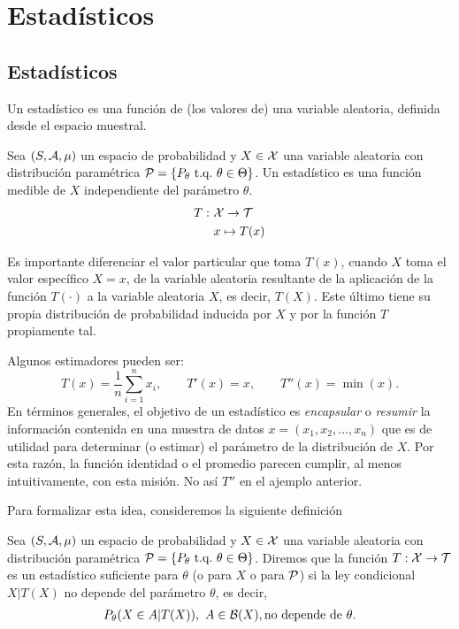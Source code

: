 

\chapter{Estadísticos}


\section{Estadísticos}

Un estadístico es una función de (los valores de) una variable aleatoria, definida desde el espacio muestral. 

\begin{definition}[Estadístico]
\label{def:estadístico}
Sea $(S,{\mathcal A},\mu)$ un espacio de probabilidad y $X\in{\mathcal X}$ una variable aleatoria con distribución paramétrica $\cP = \{P_\theta\ \tq\ \theta\in\Theta\}$. Un estadístico es una función medible de $X$ independiente del parámetro $\theta$.
\begin{align}
	T:\ &{\mathcal X} \rightarrow {\mathcal T}\\
	&x\mapsto T(x)
\end{align} 

\end{definition}


Es importante diferenciar el valor particular que toma $T(x)$, cuando $X$ toma el valor específico $X=x$, de la variable aleatoria resultante de la aplicación de la función $T(\cdot)$ a la variable aleatoria $X$, es decir, $T(X)$. Este último tiene su propia distribución de probabilidad inducida por $X$ y por la función $T$ propiamente tal. 

Algunos estimadores pueden ser: 
\begin{equation}
	T(x) = \frac{1}{n}\sum_{i=1}^nx_i,\qquad T'(x) = x, \qquad T''(x) = \min(x).
\end{equation}
En términos generales, el objetivo de un estadístico es \textit{encapsular} o \textit{resumir} la información contenida en una muestra de datos $x = (x_1,x_2,\ldots,x_n)$ que es de utilidad para determinar (o estimar) el parámetro de la distribución de $X$. Por esta razón, la función identidad o el promedio parecen cumplir, al menos intuitivamente, con esta misión. No así $T''$ en el ajemplo anterior. 

Para formalizar esta idea, consideremos la siguiente definición


\begin{definition}
\label{def:estadístico_suficiente}
Sea $(S,{\mathcal A},\mu)$ un espacio de probabilidad y $X\in{\mathcal X}$ una variable aleatoria con distribución paramétrica $\cP = \{P_\theta\ \tq\ \theta\in\Theta\}$. Diremos que la función $T:{\mathcal X}\rightarrow{\mathcal T}$ es un estadístico suficiente para $\theta$ (o para $X$ o para ${\mathcal P}$) si la ley condicional $X|T(X)$ no depende del parámetro $\theta$, es decir, 
\begin{align}
	P_\theta(X\in A | T(X)),\ A\in{\mathcal B}(X), \text{no depende de }\theta.
\end{align} 
\end{definition}

